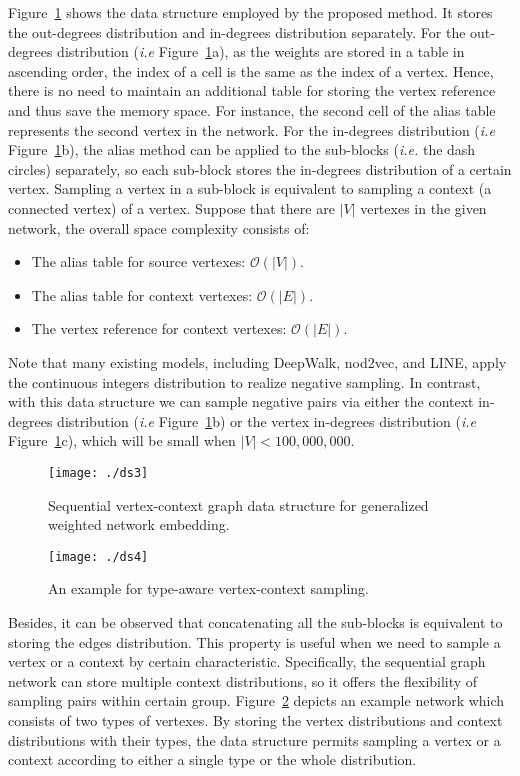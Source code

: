 Figure~\ref{fig:v2c} shows the data structure employed by the proposed method. It stores the out-degrees distribution and in-degrees distribution separately. For the out-degrees distribution (\textit{i.e} Figure~\ref{fig:v2c}a), as the weights are stored in a table in ascending order, the index of a cell is the same as the index of a vertex.  Hence, there is no need to maintain an additional table for storing the vertex reference and thus save the memory space.  For instance, the second cell of the alias table represents the second vertex in the network. For the in-degrees distribution (\textit{i.e} Figure~\ref{fig:v2c}b), the alias method can be applied to the sub-blocks (\textit{i.e.} the dash circles) separately, so each sub-block stores the in-degrees distribution of a certain vertex.  Sampling a vertex in a sub-block is equivalent to sampling a context (a connected vertex) of a vertex. Suppose that there are $|V|$ vertexes in the given network, the overall space complexity consists of:
\begin{itemize}
  \item The alias table for source vertexes: $\mathcal{O}(|V|)$.
  \item The alias table for context vertexes: $\mathcal{O}(|E|)$.
  \item The vertex reference for context vertexes: $\mathcal{O}(|E|)$.
\end{itemize}
Note that many existing models, including DeepWalk, nod2vec, and LINE, apply the continuous integers distribution to realize negative sampling. In contrast, with this data structure we can sample negative pairs via either the context in-degrees distribution (\textit{i.e} Figure~\ref{fig:v2c}b) or the vertex in-degrees distribution (\textit{i.e} Figure~\ref{fig:v2c}c), which will be small when $|V| < 100,000,000$.

\begin{figure}
  \centering
  \texttt{[image: ./ds3]}
  \caption{Sequential vertex-context graph data structure for generalized weighted network embedding.}
  \label{fig:v2c}
\end{figure}

\begin{figure}
  \centering
  \texttt{[image: ./ds4]}
  \caption{An example for type-aware vertex-context sampling.}
  \label{fig:v2cb}
\end{figure}

Besides, it can be observed that concatenating all the sub-blocks is equivalent to storing the edges distribution.  This property is useful when we need to sample a vertex or a context by certain characteristic.  Specifically, the sequential graph network can store multiple context distributions, so it offers the flexibility of sampling pairs within certain group.  Figure~\ref{fig:v2cb} depicts an example network which consists of two types of vertexes. By storing the vertex distributions and context distributions with their types, the data structure permits sampling a vertex or a context according to either a single type or the whole distribution.

